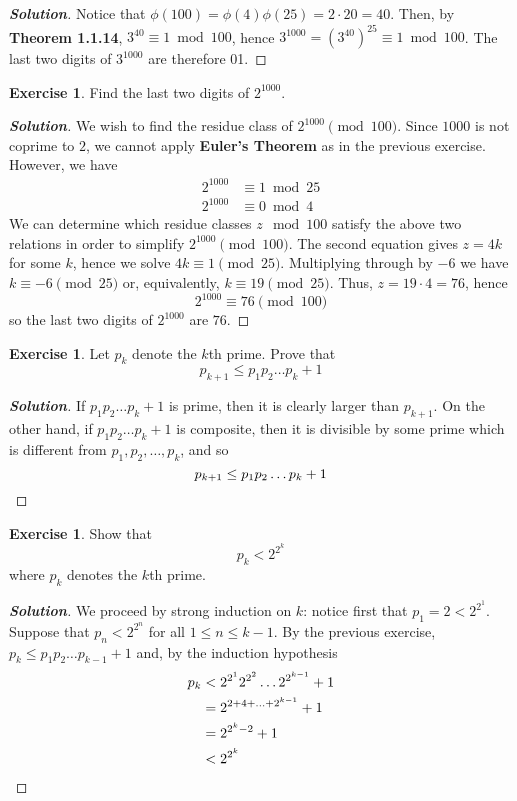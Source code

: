 \documentclass[12pt,leqno]{book}
\numberwithin{equation}{section}
\theoremstyle{definition}
\newtheorem{exer}[thm]{Exercise}
\newenvironment{Solution}{\begin{proof}[\textnormal{\textbf{Solution}}]}{\end{proof}}
\begin{document}
\begin{Solution}
 Notice that $\phi(100)=\phi(4)\phi(25)=2\cdot20=40$. Then, by \textbf{Theorem 1.1.14}, $3^40\equiv1\bmod{100}$, hence $3^1000=\left(3^{40}\right)^25\equiv1\bmod{100}$. The last two digits of $3^{1000}$ are therefore 01.
\end{Solution}


\begin{exer}
 Find the last two digits of $2^{1000}$.
\end{exer}

\begin{Solution}
 We wish to find the residue class of $2^{1000}\pmod{100}$. Since $1000$ is not coprime to $2$, we cannot apply \textbf{Euler's Theorem} as in the previous exercise. However, we have \begin{align*}2^{1000}&\equiv1\bmod{25}\\2^{1000}&\equiv0\bmod{4}\end{align*} We can determine which residue classes $z\mod{100}$ satisfy the above two relations in order to simplify $2^{1000}\pmod{100}$. The second equation gives $z=4k$ for some $k$, hence we solve $4k\equiv1\pmod{25}$. Multiplying through by $-6$ we have $k\equiv-6\pmod{25}$ or, equivalently, $k\equiv19\pmod{25}$. Thus, $z=19\cdot4=76$, hence \[2^{1000}\equiv76\pmod{100}\] so the last two digits of $2^{1000}$ are $76$.
\end{Solution}

\begin{exer}
 Let $p_k$ denote the $k$th prime. Prove that \[p_{k+1}\leq p_1p_2\hdots p_k+1\]
\end{exer}

\begin{Solution}
 If $p_1p_2\hdots p_k+1$ is prime, then it is clearly larger than $p_{k+1}$. On the other hand, if $p_1p_2\hdots p_k+1$ is composite, then it is divisible by some prime which is different from $p_1,p_2,\hdots,p_k$, and so \[p_{k+1}\leq p_1p_2\hdots p_k+1\qedhere\]
\end{Solution}

\begin{exer}
 Show that \[p_k<2^{2^k}\] where $p_k$ denotes the $k$th prime.
\end{exer}

\begin{Solution}
 We proceed by strong induction on $k$: notice first that $p_1=2<2^{2^1}$. Suppose that $p_{n}<2^{2^{n}}$ for all $1\leq n\leq k-1$. By the previous exercise, $p_k\leq p_1p_2\hdots p_{k-1}+1$ and, by the induction hypothesis \begin{align*}p_k&<2^{2^1}2^{2^2}\hdots2^{2^{k-1}}+1\\&=2^{2+4+\hdots+2^{k-1}}+1\\&=2^{2^k-2}+1\\&<2^{2^k}\qedhere\end{align*}
\end{Solution}
\end{document}
